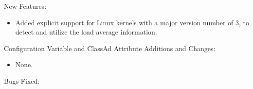 \noindent New Features:

\begin{itemize}

\item Added explicit support for Linux kernels with a major version number of 3,
to detect and utilize the load average information.

\end{itemize}

\noindent Configuration Variable and ClassAd Attribute Additions and Changes:

\begin{itemize}

\item None.

\end{itemize}

\noindent Bugs Fixed:

